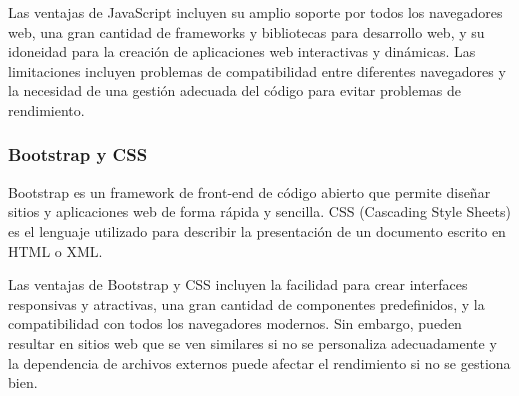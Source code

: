 Las ventajas de JavaScript incluyen su amplio soporte por todos los navegadores web, una gran cantidad de frameworks y bibliotecas para desarrollo web, y su idoneidad para la creación de aplicaciones web interactivas y dinámicas. Las limitaciones incluyen problemas de compatibilidad entre diferentes navegadores y la necesidad de una gestión adecuada del código para evitar problemas de rendimiento.

\subsubsection{Bootstrap y CSS}

Bootstrap es un framework de front-end de código abierto que permite diseñar sitios y aplicaciones web de forma rápida y sencilla. CSS (Cascading Style Sheets) es el lenguaje utilizado para describir la presentación de un documento escrito en HTML o XML\cite{Bootstrap,CSS}.

Las ventajas de Bootstrap y CSS incluyen la facilidad para crear interfaces responsivas y atractivas, una gran cantidad de componentes predefinidos, y la compatibilidad con todos los navegadores modernos. Sin embargo, pueden resultar en sitios web que se ven similares si no se personaliza adecuadamente y la dependencia de archivos externos puede afectar el rendimiento si no se gestiona bien.